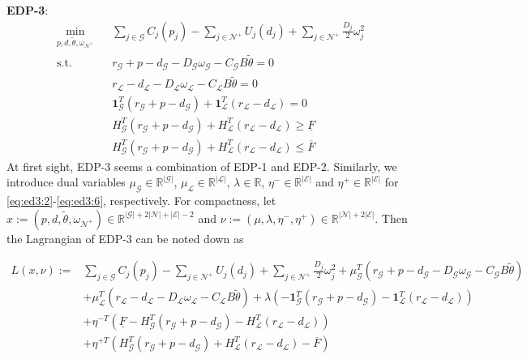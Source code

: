 \documentclass[journal,12pt,onecolumn,draftclsnofoot]{IEEEtran}
\begin{document}
\noindent
\textbf{EDP-3}:
\begin{subequations}
	\begin{eqnarray}
	\label{eq:ed3:1}
	\min_{p,d, \tilde \theta,\omega_{\mathcal{N}^+}} &&   \sum_{j\in\mathcal{G}} C_j(p_j) - \sum_{j\in\mathcal{N}^+} U_j(d_j) + \sum_{j\in\mathcal{N}^+}\frac{D_j}{2} \omega_j^2  \\
	\label{eq:ed3:2}
	\mathrm{s.t.} &&   r_\mathcal{G} +p  - d_\mathcal{G}  - D_\mathcal{G}  \omega_{\mathcal{G}}   - C_{\mathcal{G}}  B  \tilde \theta =0\\
	\label{eq:ed3:3}
	&&  r_{\mathcal{L}} - d_{\mathcal{L}} - D_\mathcal{L} \omega_{\mathcal{L}} - C_{\mathcal{L}}  B   \tilde \theta = 0  \\
	\label{eq:ed3:4}	
	 &&   \mathbf 1^T_\mathcal{G} (r_\mathcal{G}+p-d_\mathcal{G})  + \mathbf 1^T_\mathcal{L} (r_\mathcal{L}-d_\mathcal{L})  = 0 \\
	\label{eq:ed3:5}
	&&    H^T_{\mathcal{G}}(r_\mathcal{G}+p-d_\mathcal{G}) + H^T_\mathcal{L}(r_\mathcal{L}-d_\mathcal{L}) \ge \underline{F}  \\
	\label{eq:ed3:6}
	&&  H^T_{\mathcal{G}}(r_\mathcal{G}+p-d_\mathcal{G}) + H^T_\mathcal{L}(r_\mathcal{L}-d_\mathcal{L})  \le  \overline{F}
	\end{eqnarray}	\label{eq3:ed}%
\end{subequations}
At first sight, EDP-3 seems a combination of EDP-1 and EDP-2. 
Similarly, we introduce dual variables $\mu_{\mathcal{G}}\in\mathbb{R}^{|\mathcal{G}|}$, $\mu_{\mathcal{L}}\in\mathbb{R}^{|\mathcal{L}|}$, $\lambda\in\mathbb{R}$, $\eta^- \in\mathbb{R}^{|\mathcal{E}|}$ and $\eta^+ \in\mathbb{R}^{|\mathcal{E}|}$ for \eqref{eq:ed3:2}-\eqref{eq:ed3:6}, respectively. For compactness, let $x:=(p,d,\tilde \theta,\omega_{\mathcal{N}^+})\in\mathbb{R}^{|\mathcal{G}|+2|\mathcal{N}|+|\mathcal{E}|-2}$ and $\nu:=(\mu,\lambda, \eta^-,\eta^+)\in\mathbb{R}^{|\mathcal{N}|+2|\mathcal{E}|}$. Then the Lagrangian of EDP-3 can be noted down as

\begin{equation}
\begin{split}
L(x,\nu) := & \sum_{j\in\mathcal{G}} C_j(p_j) - \sum_{j\in\mathcal{N}^+} U_j(d_j) + \sum_{j\in\mathcal{N}^+}\frac{D_j}{2} \omega_j^2 + \mu_{\mathcal{G}}^T \left( r_\mathcal{G} +  p  - d_\mathcal{G}  -  D_\mathcal{G}  \omega_{\mathcal{G}}   - C_{\mathcal{G}}  B   \tilde \theta  \right) \\
& +\mu_{\mathcal{L}}^T \left(  r_{\mathcal{L}} - d_{\mathcal{L}} - D_\mathcal{L} \omega_{\mathcal{L}} - C_{\mathcal{L}}  B  \tilde \theta \right) + \lambda \left(- \mathbf 1^T_\mathcal{G} (r_\mathcal{G}+p-d_\mathcal{G})  -  \mathbf 1^T_\mathcal{L} (r_\mathcal{L}-d_\mathcal{L}) \right)   \\
& + \eta^{-T} \left(\underline{F}  -  H^T_{\mathcal{G}}(r_\mathcal{G}+p-d_\mathcal{G}) - H^T_\mathcal{L}(r_\mathcal{L}-d_\mathcal{L}) \right) \\
&+ \eta^{+T} \left(H^T_{\mathcal{G}}(r_\mathcal{G}+p-d_\mathcal{G}) + H^T_\mathcal{L}(r_\mathcal{L}-d_\mathcal{L}) - \overline{F}\right)
\end{split}
\end{equation}
\end{document}

